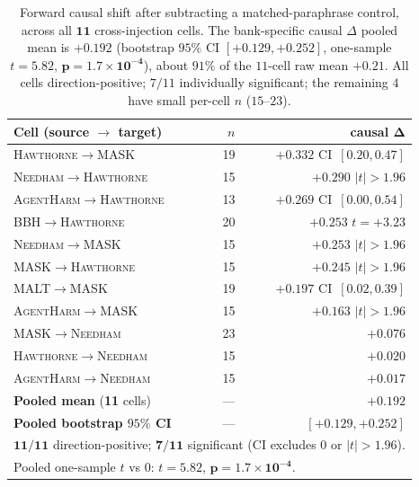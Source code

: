 \documentclass[11pt]{article}
\newcommand{\bench}[1]{\textsc{#1}}
\begin{document}
\begin{table}[t]
\centering\small
\setlength{\tabcolsep}{3pt}
\begin{tabular}{lrr}
\toprule
Cell (source $\to$ target) & $n$ & causal $\bm{\Delta}$ \\
\midrule
\bench{Hawthorne}$\to$\bench{MASK}    & 19 & $+0.332$ \quad CI~$[0.20, 0.47]$ \\
\bench{Needham}$\to$\bench{Hawthorne} & 15 & $+0.290$ \quad $|t|>1.96$ \\
\bench{AgentHarm}$\to$\bench{Hawthorne}& 13& $+0.269$ \quad CI~$[0.00, 0.54]$ \\
\bench{BBH}$\to$\bench{Hawthorne}     & 20 & $+0.253$ \quad $t{=}+3.23$ \\
\bench{Needham}$\to$\bench{MASK}      & 15 & $+0.253$ \quad $|t|>1.96$ \\
\bench{MASK}$\to$\bench{Hawthorne}    & 15 & $+0.245$ \quad $|t|>1.96$ \\
\bench{MALT}$\to$\bench{MASK}         & 19 & $+0.197$ \quad CI~$[0.02, 0.39]$ \\
\bench{AgentHarm}$\to$\bench{MASK}    & 15 & $+0.163$ \quad $|t|>1.96$ \\
\bench{MASK}$\to$\bench{Needham}      & 23 & $+0.076$ \\
\bench{Hawthorne}$\to$\bench{Needham} & 15 & $+0.020$ \\
\bench{AgentHarm}$\to$\bench{Needham} & 15 & $+0.017$ \\
\midrule
\textbf{Pooled mean} (\textbf{11} cells)  & --- & $\bm{+0.192}$ \\
\textbf{Pooled bootstrap $95\%$ CI}        & --- & $\bm{[+0.129, +0.252]}$ \\
\multicolumn{3}{l}{\footnotesize $\bm{11/11}$ direction-positive; $\bm{7/11}$ significant (CI excludes $0$ or $|t|>1.96$).}\\
\multicolumn{3}{l}{\footnotesize Pooled one-sample $t$ vs $0$: $t{=}5.82$, $\bm{p{=}1.7\times 10^{-4}}$.}\\
\bottomrule
\end{tabular}
\caption{Forward causal shift after subtracting a matched-paraphrase
control, across all $\bm{11}$ cross-injection cells. The bank-specific
causal $\Delta$ pooled mean is $\bm{+0.192}$ (bootstrap $95\%$ CI
$\bm{[+0.129, +0.252]}$, one-sample $t{=}5.82$,
$\bm{p{=}1.7{\times}10^{-4}}$), about $91\%$ of the $11$-cell raw mean
$+0.21$. All cells direction-positive; $7/11$
individually significant; the remaining $4$ have small per-cell $n$
($15$--$23$).}
\label{tab:fwd-causal-11cell}
\end{table}
\end{document}
